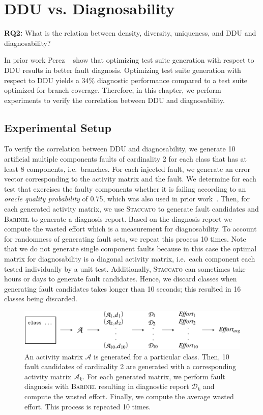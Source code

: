 \documentclass[twoside,a4paper,11pt]{memoir}
\begin{document}
\chapter{DDU vs. Diagnosability}%
\label{ch:rq2}
\begin{framed}
\noindent
\textbf{RQ2:} What is the relation between density, diversity, uniqueness, and DDU and diagnosability?
\end{framed}
In prior work Perez \etal~\cite{DBLP:conf/icse/PerezAD17} show that optimizing test suite generation with respect to DDU results in better fault diagnosis.
Optimizing test suite generation with respect to DDU yields a 34\% diagnostic performance compared to a test suite optimized for branch coverage.
Therefore, in this chapter, we perform experiments to verify the correlation between DDU and diagnosability.

\section{Experimental Setup}%
\label{sec:rq2_experimental_setup}
To verify the correlation between DDU and diagnosability, we generate 10 artificial multiple components faults of cardinality 2 for each class that has at least 8 components, i.e.\ branches.
For each injected fault, we generate an error vector corresponding to the activity matrix and the fault.
We determine for each test that exercises the faulty components whether it is failing according to an \emph{oracle quality probability} of 0.75, which was also used in prior work~\cite{DBLP:conf/icse/PerezAD17}.
Then, for each generated activity matrix, we use \textsc{Staccato} to generate fault candidates and \textsc{Barinel} to generate a diagnosis report.
Based on the diagnosis report we compute the wasted effort which is a measurement for diagnosability.
To account for randomness of generating fault sets, we repeat this process 10 times.
Note that we do not generate single component faults because in this case the optimal matrix for diagnosability is a diagonal activity matrix, i.e.\ each component each tested individually by a unit test.
Additionally, \textsc{Staccato} can sometimes take hours or days to generate fault candidates.
Hence, we discard classes when generating fault candidates takes longer than 10 seconds; this resulted in 16 classes being discarded.

\begin{figure}
  \includegraphics[width=\linewidth]{figures/effort_approach}
  \caption{An activity matrix \(\mathcal{A} \) is generated for a particular class. Then, 10 fault candidates of cardinality 2 are generated with a corresponding activity matrix \(\mathcal{A}_k \). For each generated matrix, we perform fault diagnosis with \textsc{Barinel} resulting in diagnostic report \(\mathcal{D}_k \) and compute the wasted effort. Finally, we compute the average wasted effort. This process is repeated 10 times.}%
  \label{fig:fault_generation}
\end{figure}
\end{document}

